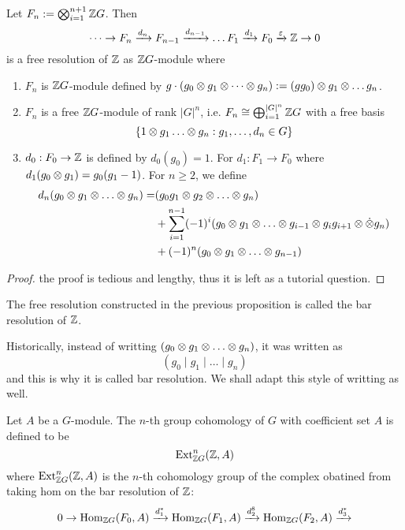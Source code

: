 \begin{pro}
    Let $F_n := \bigotimes_{i=1}^{n+1} {\mathbb Z} G$. Then
    \[\dots \to F_n \xrightarrow{d_n} F_{n-1} \xrightarrow{d_{n-1}} \dots F_1 \xrightarrow{d_1} F_0 \xrightarrow{\varepsilon} {\mathbb Z} \to 0\]
    is a free resolution of ${\mathbb Z}$ as ${\mathbb Z} G$-module where
    \begin{enumerate}
        \item $F_n$ is ${\mathbb Z} G$-module defined by $g\cdot (g_0 \otimes g_1 \otimes \dots \otimes g_n) := (gg_0) \otimes g_1 \otimes \dots g_n$.
        \item $F_n$ is a free ${\mathbb Z} G$-module of rank $|G|^n$, i.e. $F_n \cong \bigoplus_{i=1}^{|G|^n} {\mathbb Z} G$ with a free basis
        \[\sbr{1\ten g_1 \dots \ten g_n:g_1, \dots, d_n\in G}\]
        \item $d_0:F_0 \to {\mathbb Z}$ is defined by $d_0(g_0)=1$. For $d_1:F_1\to F_0$ where $d_1(g_0\otimes g_1)= g_0(g_1-1)$. For $n\geq 2$, we define
        \begin{align*}
            d_n(g_0 \ten g_1 \ten \dots \ten g_n)=
            &(g_0g_1\ten g_2 \ten \dots \ten g_n)\\ 
            &+ \sum_{i=1}^{n-1}(-1)^i(g_0\ten g_1 \ten \dots \ten g_{i-1}\ten g_{i}g_{i+1} \ten \dot \ten g_n)\\ 
            &+ (-1)^n(g_0\ten g_1 \ten \dots \ten g_{n-1})
        \end{align*}
    \end{enumerate}
\end{pro}
\begin{proof}
    the proof is tedious and lengthy, thus it is left as a tutorial question.
\end{proof}

\begin{defn} 
    The free resolution constructed in the previous proposition is called the bar resolution of ${\mathbb Z}$.
\end{defn}

\medskip

\begin{re}
    Historically, instead of writting $(g_0 \ten g_1 \ten \dots \ten g_n)$, it was written as 
    \[(g_0 \mid g_1 \mid \dots \mid g_n)\]
    and this is why it is called bar resolution. We shall adapt this style of writting as well.
\end{re}

\medskip

\begin{defn} 
    Let $A$ be a $G$-module. The $n$-th group cohomology of $G$ with coefficient set $A$ is defined to be
    \[\operatorname{Ext}_{{\mathbb Z} G}^n ({\mathbb Z}, A)\]
    where $\operatorname{Ext}_{{\mathbb Z} G}^n ({\mathbb Z}, A)$ is the $n$-th cohomology group of the complex obatined from taking hom on the bar resolution of ${\mathbb Z}$:
    \[0 \to \operatorname{Hom}_{{\mathbb Z} G}(F_0, A) \xrightarrow{d_1^*} \operatorname{Hom}_{{\mathbb Z} G}(F_1, A) \xrightarrow{d_2^8} \operatorname{Hom}_{{\mathbb Z} G}(F_2, A) \xrightarrow{d_3^*}\]
\end{defn}